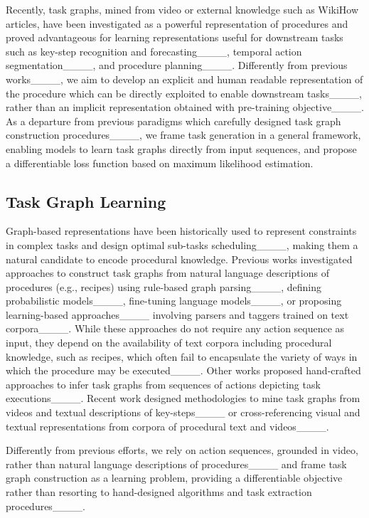 Recently, task graphs, mined from video or external knowledge such as WikiHow articles, have been investigated as a powerful representation of procedures and proved advantageous for learning representations useful for downstream tasks such as key-step recognition and forecasting____, temporal action segmentation____, and procedure planning____.
Differently from previous works____, we aim to develop an explicit and human readable representation of the procedure which can be directly exploited to enable downstream tasks____, rather than an implicit representation obtained with pre-training objective____. 
As a departure from previous paradigms which carefully designed task graph construction procedures____, we frame task generation in a general framework, enabling models to learn task graphs directly from input sequences, and propose a differentiable loss function based on maximum likelihood estimation.

 

\subsection{Task Graph Learning}
\label{sec:task_graph_construction}
Graph-based representations have been historically used to
represent constraints in complex tasks and design optimal sub-tasks scheduling____, making them a natural candidate to encode procedural knowledge.
Previous works investigated approaches to construct task graphs from natural language descriptions of procedures (e.g., recipes) using rule-based graph parsing____, defining probabilistic models____, fine-tuning language models____, or proposing learning-based approaches____ involving parsers and taggers trained on text corpora____. While these approaches do not require any action sequence as input, they depend on the availability of text corpora including procedural knowledge, such as recipes, which often fail to encapsulate the variety of ways in which the procedure may be executed____. 
Other works proposed hand-crafted approaches to infer task graphs from sequences of actions depicting task executions____. 
Recent work designed methodologies to mine task graphs from videos and textual descriptions of key-steps____ or cross-referencing visual and textual representations from corpora of procedural text and videos____.

Differently from previous efforts, we rely on action sequences, grounded in video, rather than natural language descriptions of procedures____ and frame task graph construction as a learning problem, providing a differentiable objective rather than resorting to hand-designed algorithms and task extraction procedures____.